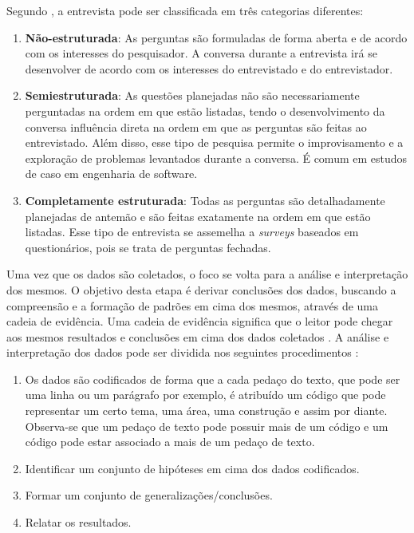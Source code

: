 Segundo \cite{caseStudySE}, a entrevista pode ser classificada em três categorias diferentes:
\begin{enumerate}
	\item \textbf{Não-estruturada}: As perguntas são formuladas de forma aberta e de acordo com os interesses do pesquisador. A conversa durante a entrevista irá se desenvolver de acordo com os interesses do entrevistado e do entrevistador.
	\item \textbf{Semiestruturada}: As questões planejadas não são necessariamente perguntadas na ordem em que estão listadas, tendo o desenvolvimento da conversa influência direta na ordem em que as perguntas são feitas ao entrevistado. Além disso, esse tipo de pesquisa permite o improvisamento e a exploração de problemas levantados durante a conversa. É comum em estudos de caso em engenharia de software.
	\item \textbf{Completamente estruturada}: Todas as perguntas são detalhadamente planejadas de antemão e são feitas exatamente na ordem em que estão listadas. Esse tipo de entrevista se assemelha a \textit{surveys} baseados em questionários, pois se trata de perguntas fechadas.
\end{enumerate}

Uma vez que os dados são coletados, o foco se volta para a análise e interpretação dos mesmos. O objetivo desta etapa é derivar conclusões dos dados, buscando a compreensão e a formação de padrões em cima dos mesmos, através de uma cadeia de evidência. Uma cadeia de evidência significa que o leitor pode chegar aos mesmos resultados e conclusões em cima dos dados coletados \cite{caseStudySE}. A análise e interpretação dos dados pode ser dividida nos seguintes procedimentos \cite{caseStudySE}:

\begin{enumerate}
	\item Os dados são codificados de forma que a cada pedaço do texto, que pode ser uma linha ou um parágrafo por exemplo, é atribuído um código que pode representar um certo tema, uma área, uma construção e assim por diante. Observa-se que um pedaço de texto pode possuir mais de um código e um código pode estar associado a mais de um pedaço de texto.
	\item Identificar um conjunto de hipóteses em cima dos dados codificados.
	\item Formar um conjunto de generalizações/conclusões.
	\item Relatar os resultados.
\end{enumerate}

